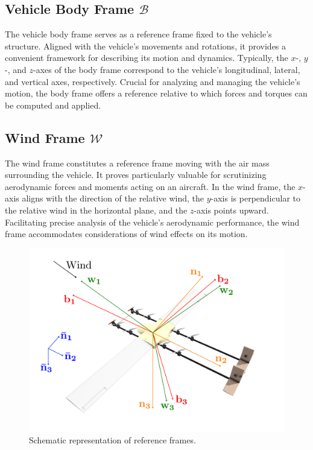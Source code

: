 \subsection[Vehicle Body Frame]{Vehicle Body Frame $\mathcal{B}$}

The vehicle body frame serves as a reference frame fixed to the vehicle's structure. Aligned with the vehicle's movements and rotations, it provides a convenient framework for describing its motion and dynamics. Typically, the $x$-, $y$-, and $z$-axes of the body frame correspond to the vehicle's longitudinal, lateral, and vertical axes, respectively. Crucial for analyzing and managing the vehicle's motion, the body frame offers a reference relative to which forces and torques can be computed and applied.

\subsection[Wind Frame]{Wind Frame $\mathcal{W}$}

The wind frame constitutes a reference frame moving with the air mass surrounding the vehicle. It proves particularly valuable for scrutinizing aerodynamic forces and moments acting on an aircraft. In the wind frame, the $x$-axis aligns with the direction of the relative wind, the $y$-axis is perpendicular to the relative wind in the horizontal plane, and the $z$-axis points upward. Facilitating precise analysis of the vehicle's aerodynamic performance, the wind frame accommodates considerations of wind effects on its motion.

\begin{figure}
    \centering
    \includegraphics[width=0.8\linewidth]{Images/reference_frame.png}
    \caption{Schematic representation of reference frames.}
    \label{fig:reference_frames}
\end{figure}

